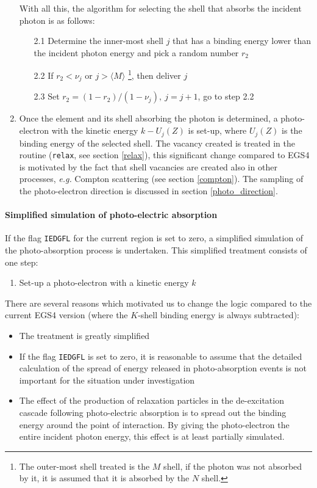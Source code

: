 \begin{enumerate}
With all this, the algorithm for selecting the shell that absorbs 
the incident photon is as follows:
\begin{itemize}
\item[2.1]
Determine the inner-most shell $j$ that has a binding energy lower 
than the incident photon energy and pick a random number $r_2$
\item[2.2]
If $r_2 < \nu_j$ or $j > \langle M \rangle$
\footnote{The outer-most shell treated is the $M$ shell, if the photon
was not absorbed by it, it is assumed that it is absorbed by the
$N$ shell.}, then deliver $j$
\item[2.3]
Set $r_2 = (1 - r_2)/(1 - \nu_j),~j = j+1$, go to step 2.2
\end{itemize} 
\item
Once the element and its shell absorbing the photon is determined, 
a photo-electron with the kinetic energy $k - U_j(Z)$ is set-up, where 
$U_j(Z)$ is the binding energy of the selected shell. 
The vacancy created is treated in the routine ({\tt relax}, see section 
\ref{relax}), 
this significant change compared to EGS4 is motivated by the 
fact that shell vacancies are created also
in other processes, {\em e.g.} Compton scattering (see section \ref{compton}).
The sampling of the photo-electron direction is discussed in section 
\ref{photo_direction}.
\end{enumerate}

\paragraph{Simplified simulation of photo-electric absorption}\hfill
\label{photo_simple}

If the flag {\tt IEDGFL} for the current region is set to zero, 
a simplified simulation of the photo-absorption process is undertaken. 
This simplified treatment consists of one step:
\begin{enumerate}
\item
Set-up a photo-electron with a kinetic energy $k$
\end{enumerate}
There are several reasons which motivated us to change the 
logic compared to the current EGS4 version (where the 
$K$-shell binding energy is always subtracted):
\begin{itemize}
\item
The treatment is greatly simplified
\item
If the flag {\tt IEDGFL} is set to zero, it is reasonable to assume 
that the detailed calculation of the spread of energy released 
in photo-absorption events is not important for the situation 
under investigation
\item
The effect of the production of relaxation particles in the 
de-excitation cascade following photo-electric absorption is 
to spread out the binding energy around the point of interaction. 
By giving the photo-electron the entire incident photon energy, 
this effect is at least partially simulated.
\end{itemize}
 
